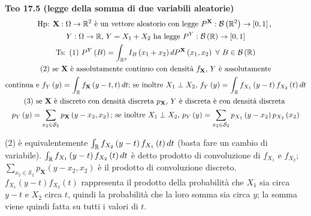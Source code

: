 \documentclass{article}
\begin{document}
\textbf{Teo 17.5 (legge della somma di due variabili aleatorie)}%
\begin{gather*}
\text{Hp: }\mathbf{X}:\Omega \rightarrow 
\mathbb{R}
^{2}\text{ \`{e} un vettore aleatorio con legge }P^{\mathbf{X}}:\mathcal{B}%
\left( 
\mathbb{R}
^{2}\right) \rightarrow \left[ 0,1\right] \text{, } \\
Y:\Omega \rightarrow 
\mathbb{R}
\text{, }Y=X_{1}+X_{2}\text{ ha legge }P^{Y}:\mathcal{B}\left( 
\mathbb{R}
\right) \rightarrow \left[ 0,1\right] \\
\text{Ts: (1) }P^{Y}\left( B\right) =\int_{%
\mathbb{R}
^{2}}I_{B}\left( x_{1}+x_{2}\right) dP^{\mathbf{X}}\left( x_{1},x_{2}\right) 
\text{ }\forall \text{ }B\in \mathcal{B}\left( 
\mathbb{R}
\right) \\
\text{(2) se }\mathbf{X}\text{ \`{e} assolutamente continuo con densit\`{a} }%
f_{\mathbf{X}}\text{, }Y\text{ \`{e} assolutamente} \\
\text{continua e }f_{Y}\left( y\right) =\int_{%
\mathbb{R}
}f_{\mathbf{X}}\left( y-t,t\right) dt\text{; se inoltre }X_{1}\perp X_{2}%
\text{, }f_{Y}\left( y\right) =\int_{%
\mathbb{R}
}f_{X_{1}}\left( y-t\right) f_{X_{2}}\left( t\right) dt \\
\text{(3) se }\mathbf{X}\text{ \`{e} discreto con densit\`{a} discreta }p_{%
\mathbf{X}}\text{, }Y\text{ \`{e} discreta \`{e} con densit\`{a} discreta }
\\
p_{Y}\left( y\right) =\sum_{x_{2}\in \mathcal{S}_{2}}p_{\mathbf{X}}\left(
y-x_{2},x_{2}\right) \text{; se inoltre }X_{1}\perp X_{2}\text{, }%
p_{Y}\left( y\right) =\sum_{x_{2}\in \mathcal{S}_{2}}p_{X_{1}}\left(
y-x_{2}\right) p_{X_{2}}\left( x_{2}\right)
\end{gather*}

(2) \`{e} equivalentemente $\int_{%
\mathbb{R}
}f_{X_{2}}\left( y-t\right) f_{X_{1}}\left( t\right) dt$ (basta fare un
cambio di variabile). $\int_{%
\mathbb{R}
}f_{X_{1}}\left( y-t\right) f_{X_{2}}\left( t\right) dt$ \`{e} detto
prodotto di convoluzione di $f_{X_{1}}$ e $f_{X_{2}}$; $\sum_{x_{2}\in 
\mathcal{S}_{2}}p_{\mathbf{X}}\left( y-x_{2},x_{2}\right) $ \`{e} il
prodotto di convoluzione discreto. $f_{X_{1}}\left( y-t\right)
f_{X_{2}}\left( t\right) $ rappresenta il prodotto della probabilit\`{a} che 
$X_{1}$ sia circa $y-t$ e $X_{2}$ circa $t$, quindi la probabilit\`{a} che
la loro somma sia circa $y$; la somma viene quindi fatta su tutti i valori
di $t$.
\end{document}
